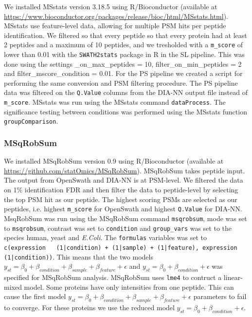 \documentclass[10pt,letterpaper]{article}
\begin{document}
We installed MSstats version 3.18.5 using R/Bioconductor (available at \url{https://www.bioconductor.org/packages/release/bioc/html/MSstats.html}). MSstats use feature-level data, allowing for multiple PSM hits per peptide identification. We filtered so that every peptide so that every protein had at least 2 peptides and a maximum of 10 peptides, and we tresholded with a \texttt{m\_score} of lower than 0.01 with the \texttt{SWATH2stats} package in R in the SL pipeline. This was done using the settings \_on\_max\_peptides = 10, filter\_on\_min\_peptides = 2 and filter\_mscore\_condition = 0.01. For the PS pipeline we created a script for performing the same conversion and PSM filtering procedure. The PS pipeline data was filtered on the \texttt{Q.Value} columns from the DIA-NN output file instead of \texttt{m\_score}. MSstats was run using the MSstats command \texttt{dataProcess}. The significance testing between conditions was performed using the MSstats function \texttt{groupComparison}.  


\subsubsection*{MSqRobSum}

We installed MSqRobSum version 0.9 using R/Bioconductor (available at \url{https://github.com/statOmics/MSqRobSum}). MSqRobSum takes peptide input. The output from OpenSwath and DIA-NN is at PSM-level. We filtered the data on 1\% identification FDR and then filter the data to peptide-level by selecting the top PSM hit as our peptide. The highest scoring PSMs are selected as our peptides, i.e. highest \texttt{m\_score} for OpenSwath and highest \texttt{Q.Value} for DIA-NN. MsqRobSum was run using the MSqRobSum command \texttt{msqrobsum}, mode was set to \texttt{msqrobsum}, contrast was set to \texttt{condition} and \texttt{group\_vars} was set to the species human, yeast and \textit{E.Coli}. The \texttt{formulas} variables was set to \texttt{c(expression ~ (1|condition) + (1|sample) + (1|feature), expression ~ (1|condition))}. This means that the two models $y_{st} = \beta_0 + \beta_{condition} + \beta_{sample} + \beta_{feature} + \epsilon$ and $y_{st} = \beta_0 + \beta_{condition} + \epsilon$ was specified for MSqRobSum analysis. MSqRobSum uses \texttt{lme4} to contruct a linear-mixed model. Some proteins have only intensities from one peptide. This can cause the first model $y_{st} = \beta_0 + \beta_{condition} + \beta_{sample} + \beta_{feature} + \epsilon$ parameters to fail to converge. For these proteins we use the reduced model $y_{st} = \beta_0 + \beta_{condition} + \epsilon$. 
\end{document}
